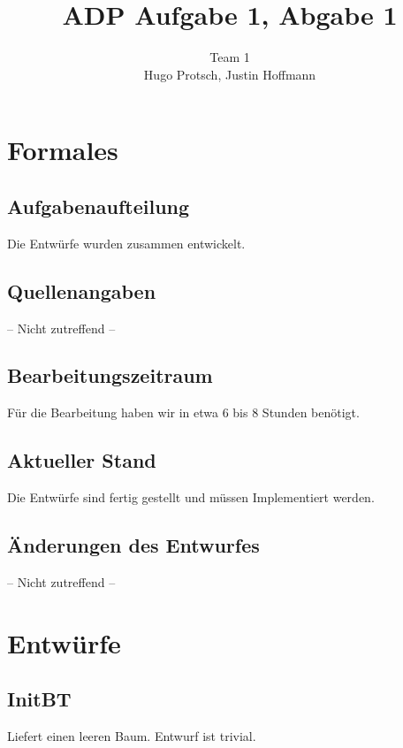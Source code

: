 \documentclass[11pt]{article}
\title{ADP Aufgabe 1, Abgabe 1}
\author{Team 1\\Hugo Protsch, Justin Hoffmann}
\begin{document}
    \maketitle


    \section{Formales}\label{sec:Formales}


    \subsection{Aufgabenaufteilung}
    Die Entwürfe wurden zusammen entwickelt.

    \subsection{Quellenangaben}
    -- Nicht zutreffend --


    \subsection{Bearbeitungszeitraum}
    Für die Bearbeitung haben wir in etwa 6 bis 8 Stunden benötigt.

    \subsection{Aktueller Stand}
    Die Entwürfe sind fertig gestellt und müssen Implementiert werden.


    \subsection{Änderungen des Entwurfes}
    -- Nicht zutreffend --


    \section{Entwürfe}\label{sec:entwürfe}

    \subsection{InitBT}
    Liefert einen leeren Baum. Entwurf ist trivial.
\end{document}
